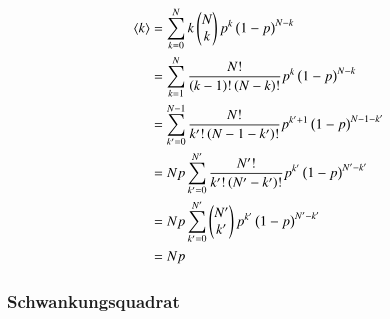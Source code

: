\begin{align*}
\mw{k} &= \sum_{k=0}^N k\begin{pmatrix}N\\k\end{pmatrix}p^k\del{1-p}^{N-k} \\
       &= \sum_{k=1}^N \frac{N!}{\del{k-1}!\del{N-k}!}p^k\del{1-p}^{N-k} \\
       &= \sum_{k'=0}^{N-1} \frac{N!}{k'!\del{N-1-k'}!}p^{k'+1}\del{1-p}^{N-1-k'} \\
       &= Np\sum_{k'=0}^{N'} \frac{N'!}{k'!\del{N'-k'}!}p^{k'}\del{1-p}^{N'-k'}\\
       &= Np\sum_{k'=0}^{N'} \begin{pmatrix}N'\\k'\end{pmatrix}p^{k'}\del{1-p}^{N'-k'}\\
       &= Np
\end{align*}

\subsubsection{Schwankungsquadrat}


